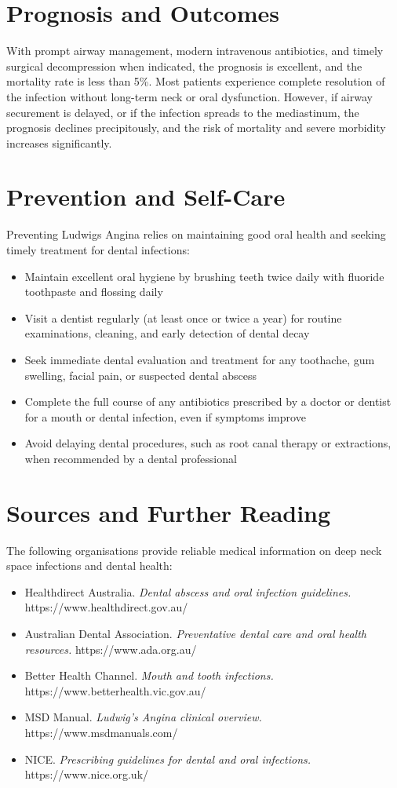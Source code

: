 \section*{Prognosis and Outcomes}
With prompt airway management, modern intravenous antibiotics, and timely surgical decompression when indicated, the prognosis is excellent, and the mortality rate is less than 5\%. Most patients experience complete resolution of the infection without long-term neck or oral dysfunction. However, if airway securement is delayed, or if the infection spreads to the mediastinum, the prognosis declines precipitously, and the risk of mortality and severe morbidity increases significantly.

\section*{Prevention and Self-Care}
Preventing Ludwigs Angina relies on maintaining good oral health and seeking timely treatment for dental infections:
\begin{itemize}
    \item Maintain excellent oral hygiene by brushing teeth twice daily with fluoride toothpaste and flossing daily
    \item Visit a dentist regularly (at least once or twice a year) for routine examinations, cleaning, and early detection of dental decay
    \item Seek immediate dental evaluation and treatment for any toothache, gum swelling, facial pain, or suspected dental abscess
    \item Complete the full course of any antibiotics prescribed by a doctor or dentist for a mouth or dental infection, even if symptoms improve
    \item Avoid delaying dental procedures, such as root canal therapy or extractions, when recommended by a dental professional
\end{itemize}

\section*{Sources and Further Reading}
The following organisations provide reliable medical information on deep neck space infections and dental health:
\begin{itemize}
    \item Healthdirect Australia. \textit{Dental abscess and oral infection guidelines.} https://www.healthdirect.gov.au/
    \item Australian Dental Association. \textit{Preventative dental care and oral health resources.} https://www.ada.org.au/
    \item Better Health Channel. \textit{Mouth and tooth infections.} https://www.betterhealth.vic.gov.au/
    \item MSD Manual. \textit{Ludwig's Angina clinical overview.} https://www.msdmanuals.com/
    \item NICE. \textit{Prescribing guidelines for dental and oral infections.} https://www.nice.org.uk/
\end{itemize}
